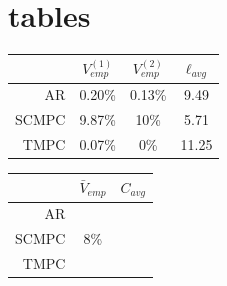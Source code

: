 \documentclass[12 pt]{report}
\begin{document}
\section{tables}

\begin{center}
\begin{tabular}{| r | c | c | c |}
	\hline
	& $V_{emp}^{(1)}$ & $V_{emp}^{(2)}$ & $\ell_{avg}$ \\ \hline
	AR & 0.20\% & 0.13\% & 9.49\\ \hline
	SCMPC & 9.87\%  & 10\% & 5.71 \\ \hline
	TMPC & 0.07\% & 0\% & 11.25\\ \hline
\end{tabular}
\end{center}

\begin{center}
	\begin{tabular}{| r | c | c |}
		\hline
		& $\bar{V}_{emp}$ & $C_{avg}$ \\ \hline
		AR    &        &  \\ \hline
		SCMPC & 8\%    &  \\ \hline
		TMPC  &        &  \\ \hline
	\end{tabular}
\end{center}




\end{document}
